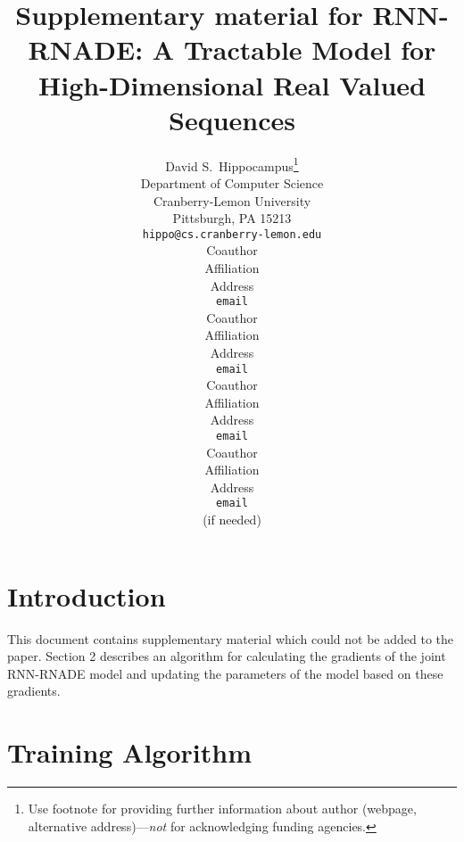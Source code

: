 \documentclass{article} %
\title{Supplementary material for RNN-RNADE: A Tractable Model for High-Dimensional Real Valued Sequences}
\author{
David S.~Hippocampus\thanks{ Use footnote for providing further information
about author (webpage, alternative address)---\emph{not} for acknowledging
funding agencies.} \\
Department of Computer Science\\
Cranberry-Lemon University\\
Pittsburgh, PA 15213 \\
\texttt{hippo@cs.cranberry-lemon.edu} \\
\And
Coauthor \\
Affiliation \\
Address \\
\texttt{email} \\
\AND
Coauthor \\
Affiliation \\
Address \\
\texttt{email} \\
\And
Coauthor \\
Affiliation \\
Address \\
\texttt{email} \\
\And
Coauthor \\
Affiliation \\
Address \\
\texttt{email} \\
(if needed)\\
}
\begin{document}
\maketitle


\section{Introduction}

This document contains supplementary material which could not be added to the paper. Section 2 describes an algorithm for calculating the gradients of the joint RNN-RNADE model and updating the parameters of the model based on these gradients. 

\section{Training Algorithm}
\end{document}
